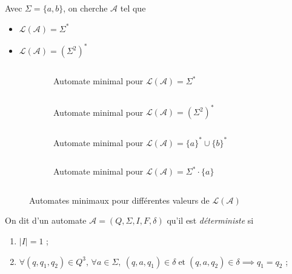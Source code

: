 \begin{exm}
	Avec $\Sigma = \{a,b\}$, on cherche $\mathcal{A}$\/ tel que
	\begin{itemize}
		\item$\mathcal{L}(\mathcal{A}) = \Sigma^*$
		\item $\mathcal{L}(\mathcal{A}) = (\Sigma^2)^*$\/
	\end{itemize}
\end{exm}

\begin{figure}[H]
	\centering
	$\quad$\\
	\begin{subfigure}{0.35\textwidth}
		\centering
		\caption{Automate minimal pour $\mathcal{L}(\mathcal{A}) = \Sigma^*$}
	\end{subfigure}
	$\quad$
	\begin{subfigure}{0.35\textwidth}
		\centering
		\caption{Automate minimal pour $\mathcal{L}(\mathcal{A}) = (\Sigma^2)^*$}
	\end{subfigure}
	$\quad$\\
	\begin{subfigure}{0.35\textwidth}
		\centering
		\caption{Automate minimal pour $\mathcal{L}(\mathcal{A}) = \{a\}^* \cup \{b\}^*$}
	\end{subfigure}
	$\quad$
	\begin{subfigure}{0.35\textwidth}
		\centering
		\caption{Automate minimal pour $\mathcal{L}(\mathcal{A}) = \Sigma^* \cdot \{a\}$}
	\end{subfigure}
	$\quad$\\
	\caption{Automates minimaux pour différentes valeurs de $\mathcal{L}(\mathcal{A})$}
\end{figure}

\begin{defn}
	On dit d'un automate $\mathcal{A} = (Q, \Sigma, I, F, \delta)$\/ qu'il est {\it déterministe}\/ si
	\begin{enumerate}
		\item $|I| = 1$\/ ;
		\item $\forall (q, q_1, q_2) \in Q^3,\,\forall a \in \Sigma,\:(q,a,q_1) \in \delta \mathrel{\text{et}} (q, a, q_2) \in \delta \implies q_1 = q_2$ ;
	\end{enumerate}
\end{defn}


